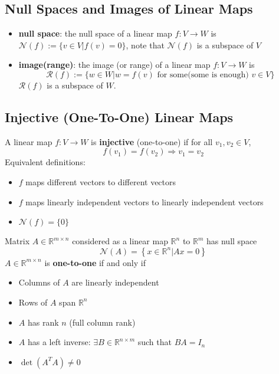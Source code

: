 \documentclass[10pt,a4paper,oneside]{article}
\begin{document}
\subsection{Null Spaces and Images of Linear Maps}
\begin{itemize}
	\item \textbf{null space}: the null space of a linear map $f : V \rightarrow W$ is $\mathcal{N}(f) :=\{v \in V | f(v)=0\}$, note that $\mathcal{N}(f)$ is a subspace of $V$
	\item \textbf{image(range)}: the image (or range) of a linear map $f : V \rightarrow W$ is
	\[
	\mathcal{R}(f) :=\{w \in W | w=f(v) \text { for some(some is enough) } v \in V\}
	\]
	$\mathcal{R}(f)$ is a subspace of $W$.
\end{itemize}

\subsection{Injective (One-To-One) Linear Maps}
A linear map $f : V \rightarrow W$ is \textbf{injective} (one-to-one) if for all $v_{1}, v_{2} \in V$,
\[
f\left(v_{1}\right)=f\left(v_{2}\right) \Rightarrow v_{1}=v_{2}
\]
Equivalent definitions:
\begin{itemize}
\item $f$ maps different vectors to different vectors
\item $f$ maps linearly independent vectors to linearly independent vectors
\item $\mathcal{N}(f)=\{0\}$
\end{itemize}
Matrix $A \in \mathbb{R}^{m \times n}$ considered as a linear map $\mathbb{R}^{n}$ to $\mathbb{R}^{m}$ has null space
\[
\mathcal{N}(A)=\left\{x \in \mathbb{R}^{n} | A x=0\right\}
\]
$A \in \mathbb{R}^{m \times n}$ is \textbf{one-to-one} if and only if
\begin{itemize}
\item Columns of $A$ are linearly independent
\item Rows of $A$ span $\mathbb{R}^n$
\item $A$ has rank $n$ (full column rank)
\item $A$ has a left inverse: $\exists B \in \mathbb{R}^{n \times m}$ such that $B A=I_{n}$
\item $\det(A^TA)\neq0$
\end{itemize}
\end{document}
